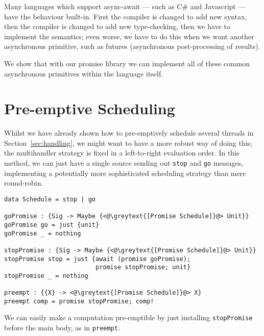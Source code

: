 \documentclass[msc,deptreport,cs]{infthesis} %
\newcommand{\code}[1]{\lstinline{#1}}
\newcommand{\greytext}[1]{\textcolor{black!40}{#1}}
\begin{document}
Many languages which support async-await --- such as C# and Javascript --- have
the behaviour built-in. First the compiler is changed to add new syntax, then
the compiler is changed to add new type-checking, then we have to implement the
semantics; even worse, we have to do this when we want another asynchronous
primitive, such as futures (asynchronous post-processing of results).

We show that with our promise library we can implement all of these common
asynchronous primitives within the language itself.

\section{Pre-emptive Scheduling}
\label{sec:pre-emptive-scheduling}



Whilst we have already shown how to pre-emptively schedule several threads in
Section~\ref{sec:handling}, we might want to have a more robust way of doing
this; the multihandler strategy is fixed in a left-to-right evaluation order. In
this method, we can just have a single source sending out \code{stop} and
\code{go} messages, implementing a potentially more sophisticated scheduling
strategy than mere round-robin.

\begin{lstlisting}
data Schedule = stop | go

goPromise : {Sig -> Maybe {<@\greytext{[Promise Schedule]}@> Unit}}
goPromise go = just {unit}
goPromise _ = nothing

stopPromise : {Sig -> Maybe {<@\greytext{[Promise Schedule]}@> Unit}}
stopPromise stop = just {await (promise goPromise);
                         promise stopPromise; unit}
stopPromise _ = nothing

preempt : {{X} -> <@\greytext{[Promise Schedule]}@> X}
preempt comp = promise stopPromise; comp!
\end{lstlisting}

\noindent We can easily make a computation pre-emptible by just installing
\code{stopPromise} before the main body, as in \code{preempt}.
\end{document}
